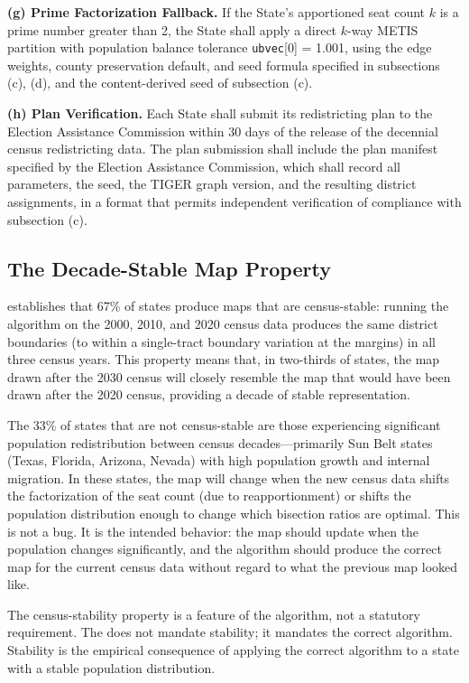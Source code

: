 \begin{statute}
\medskip
\noindent\textbf{(g) Prime Factorization Fallback.}
If the State's apportioned seat count $k$ is a prime number greater than 2,
the State shall apply a direct $k$-way METIS partition with population balance
tolerance \texttt{ubvec}[0] = 1.001, using the edge weights, county preservation
default, and seed formula specified in subsections (c), (d), and the
content-derived seed of subsection (c).

\medskip
\noindent\textbf{(h) Plan Verification.}
Each State shall submit its redistricting plan to the Election Assistance
Commission within 30 days of the release of the decennial census redistricting
data.
The plan submission shall include the plan manifest specified by the Election
Assistance Commission, which shall record all parameters, the seed, the TIGER
graph version, and the resulting district assignments, in a format that permits
independent verification of compliance with subsection (c).
\end{statute}

\subsection{The Decade-Stable Map Property}

\citet{b15paper} establishes that 67\% of states produce \ar{} maps that are
census-stable: running the algorithm on the 2000, 2010, and 2020 census data
produces the same district boundaries (to within a single-tract boundary
variation at the margins) in all three census years.
This property means that, in two-thirds of states, the map drawn after the
2030 census will closely resemble the map that would have been drawn after
the 2020 census, providing a decade of stable representation.

The 33\% of states that are not census-stable are those experiencing
significant population redistribution between census decades---primarily
Sun Belt states (Texas, Florida, Arizona, Nevada) with high population
growth and internal migration.
In these states, the \dia{} map will change when the new census data shifts
the factorization of the seat count (due to reapportionment) or shifts the
population distribution enough to change which bisection ratios are optimal.
This is not a bug.
It is the intended behavior: the map should update when the population changes
significantly, and the algorithm should produce the correct map for the
current census data without regard to what the previous map looked like.

The census-stability property is a feature of the algorithm, not a statutory
requirement.
The \dia{} does not mandate stability; it mandates the correct algorithm.
Stability is the empirical consequence of applying the correct algorithm
to a state with a stable population distribution.

